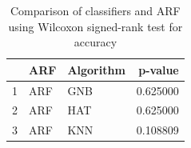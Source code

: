 \begin{table}
\footnotesize
\caption{Comparison of classifiers and ARF using Wilcoxon signed-rank test for accuracy}
\label{tab:ARF wilcoxon ACC comparison}
\begin{tabular}{lllr}
\hline
 & ARF & Algorithm & p-value \\
\hline
1 & ARF & GNB & 0.625000 \\
2 & ARF & HAT & 0.625000 \\
3 & ARF & KNN & 0.108809 \\
\hline
\end{tabular}
\end{table}
